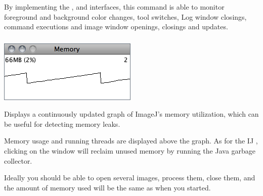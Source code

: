 

\subsubsection[\protect\userinterface{Monitor Events\ldots{}}]{\protect{}\label{sub:Monitor-Events...}}

By implementing the , 
and  interfaces, this command is able to monitor
foreground and background color changes, tool switches, Log window
closings, command executions and image window openings, closings and
updates.




\subsubsection[\protect\userinterface{Monitor Memory\ldots{}}]{\protect{}\label{sub:Monitor-Memory...}}

\begin{minipage}[c][1\totalheight][t]{0.36\columnwidth}%
\includegraphics[scale=0.55]{images/Memory}%
\end{minipage}%
\begin{minipage}[c][1\totalheight][t]{0.64\columnwidth}%
Displays a continuously updated graph of ImageJ's memory utilization,
which can be useful for detecting memory leaks. \medskip{}


Memory usage and running threads are displayed above the graph. As
for the IJ , clicking on the window will
reclaim unused memory by running the Java garbage collector.%
\end{minipage}

Ideally you should be able to open several images, process them, close
them, and the amount of memory used will be the same as when you started.


